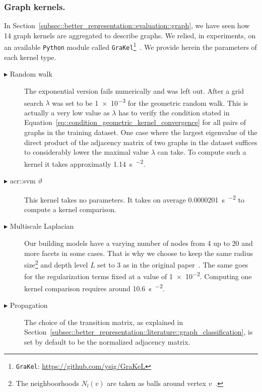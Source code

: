         \subsubsection{Graph kernels.}
            In Section~\ref{subsec::better_representation::evaluation::graph}, we have seen how 14 graph kernels are aggregated to describe graphs.
            We relied, in experiments, on an available \verb!Python! module called \verb!GraKel!\footnote{\verb!GraKel!: \href{https://github.com/ysig/GraKeL}{\url{https://github.com/ysig/GraKeL}}}~\parencite{siglidis2018grakel}.
            We provide herein the parameters of each kernel type.
            \begin{description}
                \item[\(\blacktriangleright\) Random walk] The exponential version fails numerically and was left out.
                    After a grid search \(\lambda\) was set to be \num[scientific-notation = true]{1e-3} for the geometric random walk.
                    This is actually a very low value as \(\lambda\) has to verify the condition stated in Equation~\ref{eq::condition_geometric_kernel_convergence} for all pairs of graphs in the training dataset.
                    One case where the largest eigenvalue of the direct product of the adjacency matrix of two graphs in the dataset suffices to considerably lower the maximal value \(\lambda\) can take.
                    To compute such a kernel it takes approximatly \SI{1.14}{\s\per\building\squared}.
                \item[\(\blacktriangleright\) \gls{acr::svm} \(\vartheta\)] This kernel takes no parameters.
                    It takes on average \SI[scientific-notation = true]{0.0000201}{\s\per\building\squared} to compute a kernel comparison.
                \item[\(\blacktriangleright\) Multiscale Laplacian] Our building models have a varying number of nodes from 4 up to 20 and more facets in some cases.
                    That is why we choose to keep the same radius size\footnote{The neighboorhoods \(N_l(v)\) are taken as balls around vertex \(v\)~\parencite{kondor2016multiscale}.} and depth level \(L\) set to 3 as in the original paper~\parencite{kondor2016multiscale}.
                    The same goes for the regularization terms fixed at a value of \num[scientific-notation = true]{1e-2}.
                    Computing one kernel comparison requires around \SI{10.6}{\s\per\building\squared}.
                \item[\(\blacktriangleright\) Propagation] The choice of the transition matrix, as explained in Section~\ref{subsec::better_representation::literature::graph_classification}, is set by default to be the normalized adjacency matrix.

\end{description}

